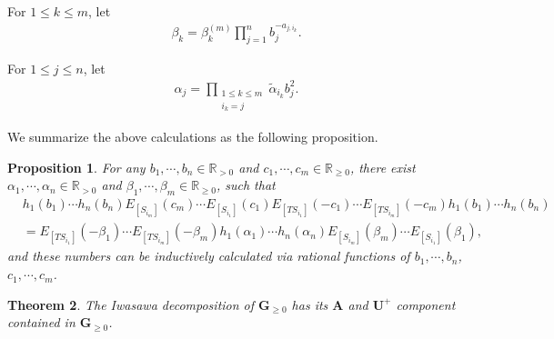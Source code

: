 \documentclass[12pt]{amsart}
\newtheorem{theorem}{Theorem}[section]
\newtheorem{proposition}[theorem]{Proposition}
\begin{document}
For $1\leq k\leq m$, let 
\begin{align*}
    \beta_k=\beta_k^{(m)}\prod_{j=1}^{n} b_j^{-a_{j,i_k}}.
\end{align*}

For $1\leq j\leq n$, let 
\begin{align*}
    \alpha_j=\prod_{\substack{1\leq k\leq m\\i_k=j}} \tilde{\alpha}_{i_k} b_j^2.
\end{align*}

We summarize the above calculations as the following proposition.

\begin{proposition}\label{ab}
    For any $b_1,\cdots,b_n\in \mathbb{R}_{>0}$ and $c_1,\cdots,c_m\in \mathbb{R}_{\geq 0}$, there exist $\alpha_1,\cdots,\alpha_n\in \mathbb{R}_{>0}$ and $\beta_1,\cdots,\beta_m \in \mathbb{R}_{\geq 0}$, such that 
\begin{align*}
    &h_1(b_1)\cdots h_n(b_n) E_{[S_{i_m}]}(c_m) \cdots E_{[S_{i_1}]}(c_1)E_{[TS_{i_1}]}(-c_1)\cdots E_{[TS_{i_m}]}(-c_m) h_1(b_1)\cdots h_n(b_n) \\
    &= E_{[TS_{i_1}]}(-\beta_1)\cdots E_{[TS_{i_m}]}(-\beta_m)h_1(\alpha_1)\cdots h_n(\alpha_n) E_{[S_{i_m}]}(\beta_m)\cdots E_{[S_{i_1}]}(\beta_1),
\end{align*}
and these numbers can be inductively calculated via rational functions of $b_1,\cdots,b_n$, $c_1,\cdots,c_m$.
\end{proposition}

\begin{theorem}
    The Iwasawa decomposition of $\mathbf{G}_{\geq 0}$ has its $\mathbf{A}$ and $\mathbf{U}^+$ component contained in $\mathbf{G}_{\geq 0}$.
\end{theorem}
\end{document}
